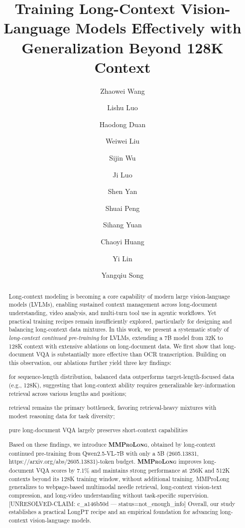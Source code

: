 \documentclass{llmxive}
\title{Training Long-Context Vision-Language Models Effectively with Generalization Beyond 128K Context}
\author{Zhaowei Wang \and Lishu Luo \and Haodong Duan \and Weiwei Liu \and Sijin Wu \and Ji Luo \and Shen Yan \and Shuai Peng \and Sihang Yuan \and Chaoyi Huang \and Yi Lin \and Yangqiu Song}
\providecommand{\emph}[1]{\textit{#1}}
\providecommand{\modelname}{\textsc{\textbf{MMProLong}}\xspace}
\begin{document}
\maketitle
\begin{abstract}
Long-context modeling is becoming a core capability of modern large vision-language models (LVLMs), enabling sustained context management across long-document understanding, video analysis, and multi-turn tool use in agentic workflows.
Yet practical training recipes remain insufficiently explored,
particularly for designing and balancing long-context data mixtures.
In this work, we present a systematic study of \emph{long-context continued pre-training} for LVLMs, extending a 7B model from 32K to 128K context with extensive ablations on long-document data.
We first show that long-document VQA is substantially more effective than OCR transcription.
Building on this observation, our ablations further yield three key findings:
\begin{inparaenum}[i)]
\item for sequence-length distribution, balanced data outperforms target-length-focused data (e.g., 128K), suggesting that long-context ability requires generalizable key-information retrieval across various lengths and positions;
\item retrieval remains the primary bottleneck, favoring retrieval-heavy mixtures with modest reasoning data for task diversity;
\item pure long-document VQA largely preserves short-context capabilities
\end{inparaenum}
Based on these findings, we introduce \modelname, obtained by long-context continued pre-training from Qwen2.5-VL-7B with only a 5B (2605.13831, https://arxiv.org/abs/2605.13831)-token budget.
\modelname improves long-document VQA scores by 7.1\% and maintains strong performance at 256K and 512K contexts beyond its 128K training window, without additional training.
MMProLong generalizes to webpage-based multimodal needle retrieval, long-context vision-text compression, and long-video understanding without task-specific supervision. [UNRESOLVED-CLAIM: c_a146b50d — status=not_enough_info]
Overall, our study establishes a practical LongPT recipe and an empirical foundation for advancing long-context vision-language models.
\end{abstract}
%
%

\end{document}
